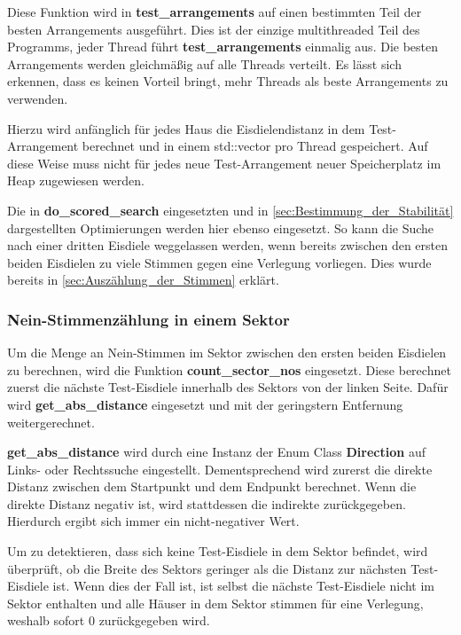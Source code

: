 \documentclass[a4paper,10pt,ngerman,captions=figureheading]{scrartcl}
\begin{document}
Diese Funktion wird in \textbf{test\_arrangements} auf einen bestimmten Teil der besten Arrangements ausgeführt.
Dies ist der einzige multithreaded Teil des Programms, jeder Thread führt \textbf{test\_arrangements} einmalig aus.
Die besten Arrangements werden gleichmäßig auf alle Threads verteilt.
Es lässt sich erkennen, dass es keinen Vorteil bringt, mehr Threads als beste Arrangements zu verwenden.

\medskip
Hierzu wird anfänglich für jedes Haus die Eisdielendistanz in dem Test-Arrangement berechnet und in einem std::vector pro Thread gespeichert.
Auf diese Weise muss nicht für jedes neue Test-Arrangement neuer Speicherplatz im Heap zugewiesen werden.

Die in \textbf{do\_scored\_search} eingesetzten und in \autoref{sec:Bestimmung_der_Stabilität} dargestellten Optimierungen werden hier ebenso eingesetzt.
So kann die Suche nach einer dritten Eisdiele weggelassen werden, wenn bereits zwischen den ersten beiden Eisdielen zu viele Stimmen gegen eine Verlegung vorliegen.
Dies wurde bereits in \autoref{sec:Auszählung_der_Stimmen} erklärt.

\subsubsection{Nein-Stimmenzählung in einem Sektor}
\label{sec:Stimmenzählung_in_einem_Sektor}
Um die Menge an Nein-Stimmen im Sektor zwischen den ersten beiden Eisdielen zu berechnen, wird die Funktion \textbf{count\_sector\_nos} eingesetzt.
Diese berechnet zuerst die nächste Test-Eisdiele innerhalb des Sektors von der linken Seite.
Dafür wird \textbf{get\_abs\_distance} eingesetzt und mit der geringstern Entfernung weitergerechnet.

\medskip
\begin{addmargin}[3em]{4em}
    \textbf{get\_abs\_distance} wird durch eine Instanz der Enum Class \textbf{Direction} auf Links- oder Rechtssuche eingestellt.
    Dementsprechend wird zurerst die direkte Distanz zwischen dem Startpunkt und dem Endpunkt berechnet.
    Wenn die direkte Distanz negativ ist, wird stattdessen die indirekte zurückgegeben.
    Hierdurch ergibt sich immer ein nicht-negativer Wert.
\end{addmargin}

\medskip
Um zu detektieren, dass sich keine Test-Eisdiele in dem Sektor befindet, wird überprüft, ob die Breite des Sektors geringer als die Distanz zur nächsten Test-Eisdiele ist.
Wenn dies der Fall ist, ist selbst die nächste Test-Eisdiele nicht im Sektor enthalten und alle Häuser in dem Sektor stimmen für eine Verlegung, weshalb sofort $0$ zurückgegeben wird.
\end{document}
